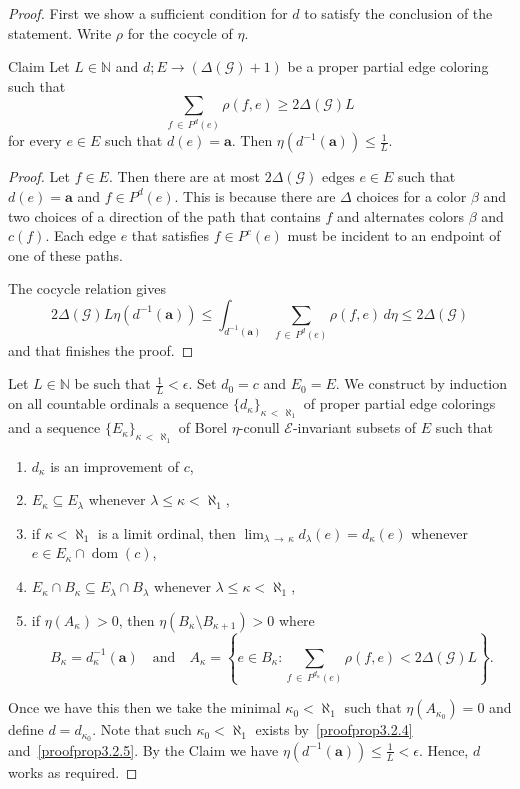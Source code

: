 \documentclass[10pt]{amsart}
\theoremstyle{definition}
\DeclareMathOperator{\dom}{dom}
\newcommand{\bfa}{\mathbf{a}}
\newcommand{\clG}{\mathcal{G}}
\newcommand{\clE}{\mathcal{E}}
\newcommand{\bbZ}{\mathbb{N}}
\begin{document}
\begin{proof}
First we show a sufficient condition for $d$ to satisfy the conclusion of the statement. Write $\rho$ for the cocycle of $\eta$.

\begin{enonce*}{Claim }
Let $L\in \bbZ$ and $d;E\to (\Delta(\clG)+1)$ be a proper partial edge coloring such that
\[
\sum_{f\,\in\,P^d(e)}\rho(f,e)\ge 2\Delta(\clG) L
\]
for every $e\in E$ such that $d(e)=\bfa$. Then $\eta(d^{-1}(\bfa))\le \frac{1}{L}$.
\end{enonce*}


\begin{proof}
Let $f\in E$. Then there are at most $2\Delta(\clG)$ edges $e\in E$ such that $d(e)=\bfa$ and $f\in P^d(e)$. This is because there are $\Delta$ choices for a color $\beta$ and two choices of a direction of the path that contains $f$ and alternates colors $\beta$ and $c(f)$. Each edge $e$ that satisfies $f\in P^c(e)$ must be incident to an endpoint of one of these paths.

The cocycle relation gives
\[
2\Delta(\clG) L\eta\left(d^{-1}(\bfa)\right) \le \int_{d^{-1}(\bfa)} \sum_{f\,\in\,P^d(e)}\rho(f,e) \, d\eta\le 2\Delta(\clG)
\]
and that finishes the proof.
\end{proof}

Let $L\in \bbZ$ be such that $\tfrac{1}{L}<\epsilon$. Set $d_0=c$ and $E_0=E$. We construct by induction on all countable ordinals a sequence $\{d_{\kappa}\}_{\kappa\,<\,\aleph_1}$ of proper partial edge colorings and a sequence $\{E_\kappa\}_{\kappa\,<\,\aleph_1}$ of Borel $\eta$-conull $\clE$-invariant subsets of $E$ such that
\begin{enumerate}
\item\label{proofprop3.2.1} $d_\kappa$ is an improvement of $c$,
\item\label{proofprop3.2.2} $E_\kappa \subseteq E_\lambda$ whenever $\lambda\le \kappa<\aleph_1$,
\item\label{proofprop3.2.3} if $\kappa<\aleph_1$ is a limit ordinal, then $\lim_{\lambda\,\to\,\kappa} d_\lambda(e)=d_\kappa(e)$ whenever $e\in E_\kappa\cap \dom(c)$,
\item\label{proofprop3.2.4} $E_\kappa\cap B_\kappa\subseteq E_\lambda \cap B_\lambda$ whenever $\lambda\le \kappa<\aleph_1$,
\item\label{proofprop3.2.5} if $\eta(A_\kappa)>0$, then $\eta(B_{\kappa}\setminus B_{\kappa+1})>0$
where 
\[
B_{\kappa}=d_\kappa^{-1}(\bfa)\quad \text{and} \quad A_{\kappa}=\left\{e\in B_\kappa:\sum_{f\,\in\,P^{d_\kappa}(e)}\rho(f,e)<2\Delta(\clG) L\right\}.
\]
\end{enumerate}
Once we have this then we take the minimal $\kappa_0<\aleph_1$ such that $\eta(A_{\kappa_0})=0$ and define $d=d_{\kappa_0}$. Note that such $\kappa_0<\aleph_1$ exists by~\eqref{proofprop3.2.4} and~\eqref{proofprop3.2.5}. By the Claim we have $\eta(d^{-1}(\bfa))\le \tfrac{1}{L}<\epsilon$. Hence, $d$ works as required.


\end{proof}
\end{document}
